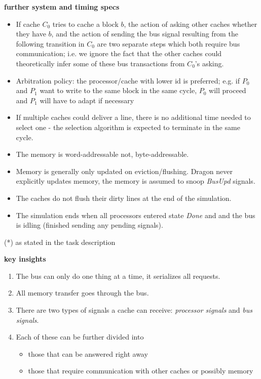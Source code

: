 \documentclass{article}
\begin{document}
\begin{multicols}{2}
\textbf{further system and timing specs}

\begin{itemize}
    \item If cache $C_0$ tries to cache a block $b$, the action of asking other caches whether they have $b$, and the action of sending the bus signal resulting from the following transition in $C_0$ are two separate steps which both require bus communication; i.e. we ignore the fact that the other caches could theoretically infer some of these bus transactions from $C_0$'s asking.
    \item Arbitration policy: the processor/cache with lower id is preferred; e.g. if $P_0$ and $P_1$ want to write to the same block in the same cycle, $P_0$ will proceed and $P_1$ will have to adapt if necessary
    \item If multiple caches could deliver a line, there is no additional time needed to select one - the selection algorithm is expected to terminate in the same cycle.
    \item The memory is word-addressable not, byte-addressable.
    \item Memory is generally only updated on eviction/flushing. Dragon never explicitly updates memory, the memory is assumed to snoop \textit{BusUpd} signals.
    \item The caches do not flush their dirty lines at the end of the simulation.
    \item The simulation ends when all processors entered state \textit{Done} and and the bus is idling (finished sending any pending signals).
\end{itemize}

(*) as stated in the task description

\textbf{key insights}

\begin{enumerate}
    \item The bus can only do one thing at a time, it serializes all requests.
    \item All memory transfer goes through the bus.
    \item There are two types of signals a cache can receive: \textit{processor signals} and \textit{bus signals}.
    \item Each of these can be further divided into
        \begin{itemize}
            \item those that can be answered right away
            \item those that require communication with other caches or possibly memory
        \end{itemize}
\end{enumerate}


\end{multicols}
\end{document}
